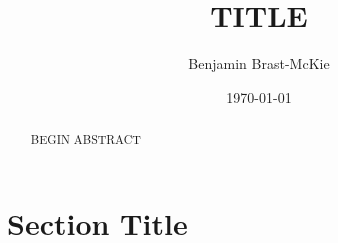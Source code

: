 \documentclass[11pt]{article} %
\begin{document}
\title{TITLE}
\author{Benjamin Brast-McKie}
\date{\today}
\maketitle
\thispagestyle{empty}

\begin{abstract}
\noindent BEGIN ABSTRACT
\end{abstract}

\doublespacing







\section{Section Title}












\newpage
\begin{small} %
\singlespacing %
\thispagestyle{empty} %
\end{small} %
\end{document}
